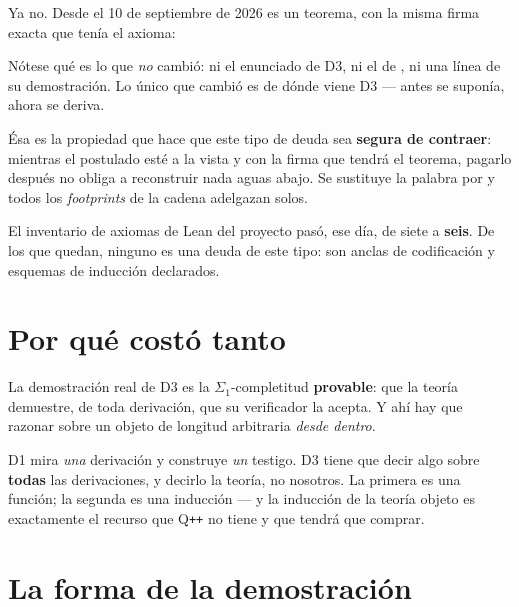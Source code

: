 Ya no. Desde el 10 de septiembre de 2026 es un teorema, con la misma firma exacta que tenía el
axioma:



\begin{leccion}
Nótese qué es lo que \emph{no} cambió: ni el enunciado de D3, ni el de , ni
una línea de su demostración. Lo único que cambió es de dónde viene D3 — antes se suponía, ahora se
deriva.

Ésa es la propiedad que hace que este tipo de deuda sea \textbf{segura de contraer}: mientras el
postulado esté a la vista y con la firma que tendrá el teorema, pagarlo después no obliga a
reconstruir nada aguas abajo. Se sustituye la palabra  por  y todos
los \emph{footprints} de la cadena adelgazan solos.
\end{leccion}

El inventario de axiomas de Lean del proyecto pasó, ese día, de siete a \textbf{seis}. De los que
quedan, ninguno es una deuda de este tipo: son anclas de codificación y esquemas de inducción
declarados.

\section{Por qué costó tanto}

La demostración real de D3 es la $\Sigma_1$-completitud \textbf{provable}: que la teoría
demuestre, de toda derivación, que su verificador la acepta. Y ahí hay que razonar sobre un objeto
de longitud arbitraria \emph{desde dentro}.

\begin{leccion}
D1 mira \emph{una} derivación y construye \emph{un} testigo. D3 tiene que decir algo sobre
\textbf{todas} las derivaciones, y decirlo la teoría, no nosotros. La primera es una función; la
segunda es una inducción — y la inducción de la teoría objeto es exactamente el recurso que
Q\texttt{++} no tiene y que  tendrá que comprar.
\end{leccion}

\section{La forma de la demostración}

